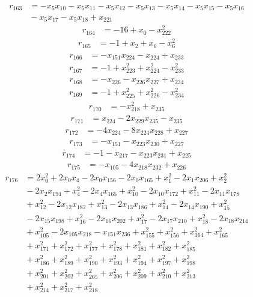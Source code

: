 \[\begin{aligned}
r_{163}&=-x_{5}x_{10}-x_{5}x_{11}-x_{5}x_{12}-x_{5}x_{13}-x_{5}x_{14}-x_{5}x_{15}-x_{5}x_{16}\\
&{}-x_{5}x_{17}-x_{5}x_{18}+x_{221}
\end{aligned}\]
\[\begin{aligned}
r_{164}&=-16+x_{0}-x_{222}^{2}
\end{aligned}\]
\[\begin{aligned}
r_{165}&=-1+x_{2}+x_{6}-x_{6}^{2}
\end{aligned}\]
\[\begin{aligned}
r_{166}&=-x_{151}x_{224}-x_{224}+x_{233}
\end{aligned}\]
\[\begin{aligned}
r_{167}&=-1+x_{223}^{2}+x_{224}^{2}-x_{233}^{2}
\end{aligned}\]
\[\begin{aligned}
r_{168}&=-x_{226}-x_{226}x_{227}+x_{234}
\end{aligned}\]
\[\begin{aligned}
r_{169}&=-1+x_{225}^{2}+x_{226}^{2}-x_{234}^{2}
\end{aligned}\]
\[\begin{aligned}
r_{170}&=-x_{218}^{2}+x_{235}
\end{aligned}\]
\[\begin{aligned}
r_{171}&=x_{224}-2x_{229}x_{235}-x_{235}
\end{aligned}\]
\[\begin{aligned}
r_{172}&=-4x_{224}-8x_{224}x_{228}+x_{227}
\end{aligned}\]
\[\begin{aligned}
r_{173}&=-x_{151}-x_{223}x_{230}+x_{227}
\end{aligned}\]
\[\begin{aligned}
r_{174}&=-1-x_{217}-x_{223}x_{231}+x_{225}
\end{aligned}\]
\[\begin{aligned}
r_{175}&=-x_{105}-4x_{218}x_{232}+x_{226}
\end{aligned}\]
\[\begin{aligned}
r_{176}&=2x_{0}^{2}+2x_{0}x_{4}-2x_{0}x_{156}-2x_{0}x_{165}+x_{1}^{2}-2x_{1}x_{206}+x_{2}^{2}\\
&{}-2x_{2}x_{194}+x_{4}^{2}-2x_{4}x_{165}+x_{10}^{2}-2x_{10}x_{172}+x_{11}^{2}-2x_{11}x_{178}\\
&{}+x_{12}^{2}-2x_{12}x_{182}+x_{13}^{2}-2x_{13}x_{186}+x_{14}^{2}-2x_{14}x_{190}+x_{15}^{2}\\
&{}-2x_{15}x_{198}+x_{16}^{2}-2x_{16}x_{202}+x_{17}^{2}-2x_{17}x_{210}+x_{18}^{2}-2x_{18}x_{214}\\
&{}+x_{105}^{2}-2x_{105}x_{218}-x_{151}x_{236}+x_{155}^{2}+x_{156}^{2}+x_{164}^{2}+x_{165}^{2}\\
&{}+x_{171}^{2}+x_{172}^{2}+x_{177}^{2}+x_{178}^{2}+x_{181}^{2}+x_{182}^{2}+x_{185}^{2}\\
&{}+x_{186}^{2}+x_{189}^{2}+x_{190}^{2}+x_{193}^{2}+x_{194}^{2}+x_{197}^{2}+x_{198}^{2}\\
&{}+x_{201}^{2}+x_{202}^{2}+x_{205}^{2}+x_{206}^{2}+x_{209}^{2}+x_{210}^{2}+x_{213}^{2}\\
&{}+x_{214}^{2}+x_{217}^{2}+x_{218}^{2}
\end{aligned}\]
